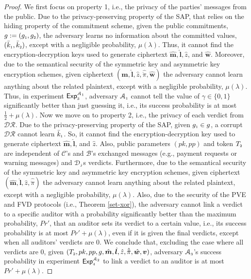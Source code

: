 % 

\begin{proof}
We first focus on property 1, i.e., the privacy of the parties' messages from the public.  Due to the privacy-preserving property of the SAP, that relies  on the hiding property of the commitment scheme, given the public commitments, $g:=(g_{\scriptscriptstyle 1}, g_{\scriptscriptstyle 2})$,  the adversary learns no information about the
committed values, $(\bar k_{\scriptscriptstyle 1}, \bar k_{\scriptscriptstyle 2})$, except with a negligible probability, $\mu(\lambda)$. Thus, it cannot find the encryption-decryption keys used to generate ciphertext  $\hat {\bm m}, \hat{\bm l}, \hat z$, and  $\hat{\bm{w}}$. Moreover, due to the semantical security of the symmetric key and asymmetric key encryption schemes,  given ciphertext $(\hat {\bm m}, \hat{\bm l}, \hat z, \hat{\ddot \pi}, \hat{\bm{w}})$ the adversary cannot learn anything  about the related plaintext, except with a negligible probability, $\mu(\lambda)$. Thus, in experiment  $\mathsf{Exp}_{\scriptscriptstyle 3}^{\mathcal{A}_{\scriptscriptstyle 1}}$,  adversary $\mathcal{A}_{\scriptscriptstyle 1}$ cannot tell the value of $\gamma\in \{0, 1\}$ significantly better than just guessing it, i.e., its success probability is at most $\frac{1}{2}+\mu(\lambda)$. Now we move on to property 2, i.e., the privacy of each verdict from $\mathcal{DR}$. Due to the privacy-preserving property of the SAP, given $g_{\scriptscriptstyle 1}\in g$, a corrupt $\mathcal{DR}$ cannot learn  $\bar k_{\scriptscriptstyle 1}$. So,  it cannot find the encryption-decryption key used to generate ciphertext  $\hat {\bm m}, \hat{\bm l}$, and $\hat z$. Also, public parameters $(pk,pp)$ and token $T_{\scriptscriptstyle 2}$ are independent of $\mathcal{C}$'s and $\mathcal{B}$'s exchanged messages (e.g., payment requests or warning messages)  and $\mathcal{D}_{\scriptscriptstyle j}$s  verdicts. Furthermore, due to  the semantical security of the symmetric key and asymmetric key encryption schemes,  given ciphertext $(\hat {\bm m}, \hat{\bm l}, \hat z, \hat{\ddot \pi})$ the adversary cannot learn anything  about the related plaintext, except with a negligible probability, $\mu(\lambda)$. Also, due to the security of the  PVE and FVD protocols (i.e., Theorem \ref{set-xor}), the adversary cannot link a verdict to a specific auditor with a probability significantly better than the maximum probability, $Pr'$, that an auditor sets its verdict to a certain value, i.e., its success probability is at most $Pr'+\mu(\lambda)$, even if it is given the final verdicts, except when all auditors' verdicts are $0$. We conclude that, excluding the case where  all verdicts are $0$, given $(T_{\scriptscriptstyle 2}, pk, pp, g, \hat{\bm m}, \hat{\bm l},  \hat z, \hat{\ddot \pi}, \hat{\bm{w}}, \bm v)$,   adversary $\mathcal{A}_{\scriptscriptstyle 3}$'s success probability in experiment $\mathsf{Exp}_{\scriptscriptstyle 4}^{\mathcal{A}_{\scriptscriptstyle 2}}$ to link a verdict to an auditor is at most $Pr'+\mu(\lambda)$. 
%
\end{proof}

